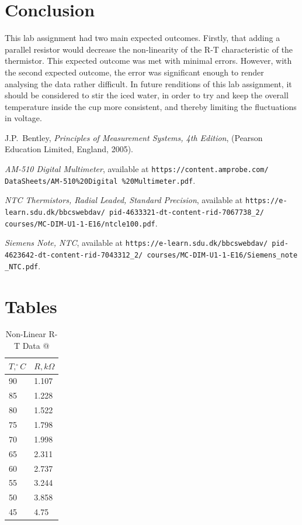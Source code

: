 \documentclass[a4,11pt]{article}
\makeatletter
\newcommand*{\rom}[1]{\expandafter\@slowromancap\romannumeral #1@}
\makeatother
\begin{document}
\section{Conclusion}
This lab assignment had two main expected outcomes. Firstly, that adding a parallel resistor would decrease the non-linearity of the R-T characteristic of the thermistor. This expected outcome was met with minimal errors.
However, with the second expected outcome, the error was significant enough to render analysing the data rather difficult. In future renditions of this lab assignment, it should be considered to stir the iced water, in order to try and keep the overall temperature inside the cup more consistent, and thereby limiting the fluctuations in voltage.
\begin{thebibliography}{99}
	J.P.\ Bentley, \textit{Principles of Measurement Systems, 4th Edition},
	(Pearson Education Limited, England, 2005).
	
	 \emph{AM-510 Digital Multimeter},   available at
	\texttt{https://content.amprobe.com/
		DataSheets/AM-510\%20Digital
		\%20Multimeter.pdf}.	
	
	 \emph{NTC Thermistors, Radial Leaded, Standard Precision},   available at
	\texttt{https://e-learn.sdu.dk/bbcswebdav/
		pid-4633321-dt-content-rid-7067738\_2/
		courses/MC-DIM-U1-1-E16/ntcle100.pdf}.
	
	 \emph{Siemens Note, NTC},   available at
	\texttt{https://e-learn.sdu.dk/bbcswebdav/
		pid-4623642-dt-content-rid-7043312\_2/
		courses/MC-DIM-U1-1-E16/Siemens\_note
		\_NTC.pdf}.
\end{thebibliography}
\appendix
\section{Tables}
\begin{table}[H]
	\centering
	\caption{Non-Linear R-T Data \rom{1}}
	\begin{tabular}{l|l}
		\hline
		$T, ^{\circ}C$ & $R, k\Omega$ \\
		\hline
		90 & 1.107  \\
		85 & 1.228  \\
		80 & 1.522  \\
		75 & 1.798  \\
		70 & 1.998  \\
		65 & 2.311  \\
		60 & 2.737  \\
		55 & 3.244  \\
		50 & 3.858  \\
		45 & 4.75  \\
	\end{tabular}
\end{table}
\end{document}
